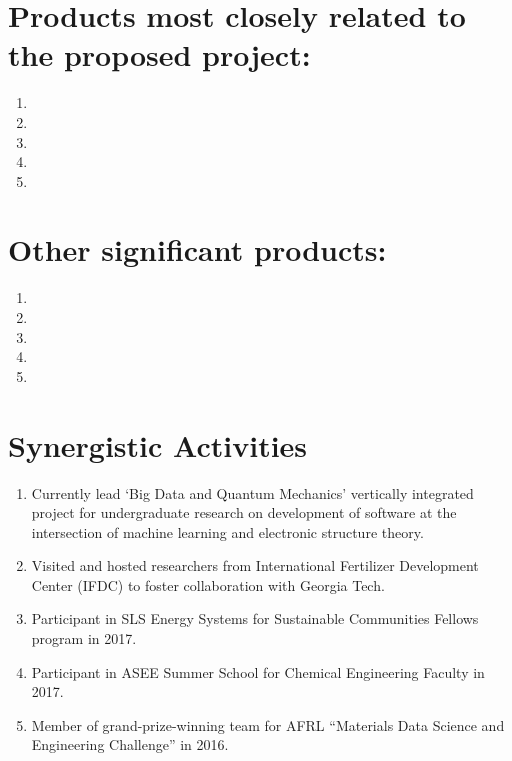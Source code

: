 \section{Products most closely related to the proposed
project:}
\def\labelenumi{\arabic{enumi}.}
\nobibliography*
\begin{enumerate}
\item {}
\item {}
\item {}
\item {}
\item {}
\end{enumerate}

\section{Other significant products:}\label{AJM-other-significant-products}

\begin{enumerate}
\def\labelenumi{\arabic{enumi}.}
\item {}
\item {}
\item {}
\item {}
\item {}

\end{enumerate}

\section{Synergistic Activities}\label{AJM-synergistic-activities}

\begin{enumerate}
\def\labelenumi{\arabic{enumi}.}
\item Currently lead `Big Data and Quantum Mechanics' vertically integrated project for undergraduate research on development of software at the intersection of machine learning and electronic structure theory.
\item Visited and hosted researchers from International Fertilizer Development Center (IFDC) to foster collaboration with Georgia Tech.
\item Participant in SLS Energy Systems for Sustainable Communities Fellows program in 2017.
\item Participant in ASEE Summer School for Chemical Engineering Faculty in 2017.
\item Member of grand-prize-winning team for AFRL ``Materials Data Science and Engineering Challenge'' in 2016.

\end{enumerate}